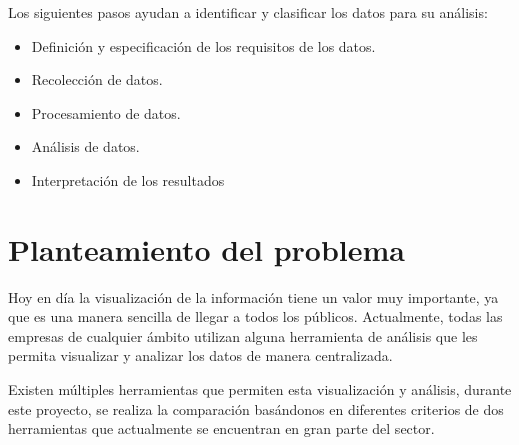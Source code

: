 \documentclass[a4paper, 12pt]{book}
\begin{document}
Los siguientes pasos ayudan a identificar y clasificar los datos para su análisis: 
 \begin{itemize}
        \item Definición y especificación de los requisitos de los datos.
        \item Recolección de datos.
        \item Procesamiento de datos.
        \item Análisis de datos.
        \item Interpretación de los resultados
    \end{itemize}




\section{Planteamiento del problema}
\label{sec:seccion}

Hoy en día la visualización de la información tiene un valor muy importante, ya que es una manera sencilla de llegar a todos los públicos. Actualmente, todas las empresas de cualquier ámbito utilizan alguna herramienta de análisis que les permita visualizar y analizar los datos de manera centralizada. 

Existen múltiples herramientas que permiten esta visualización y análisis, durante este proyecto, se realiza la comparación basándonos en diferentes criterios de dos herramientas que actualmente se encuentran en gran parte del sector. 


\end{document}
